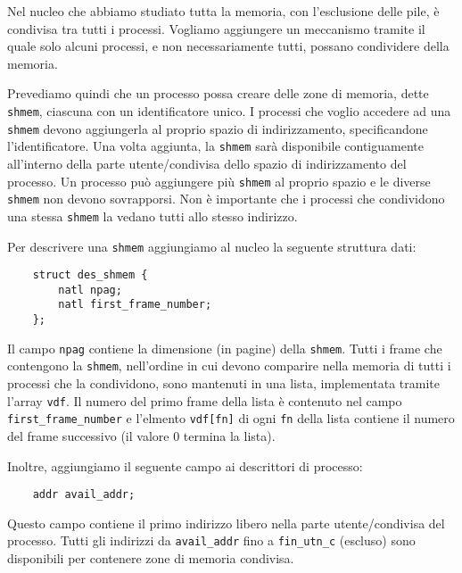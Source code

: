 Nel nucleo che abbiamo studiato tutta la memoria, con l'esclusione
delle pile, \`e condivisa tra tutti i processi. Vogliamo aggiungere un
meccanismo tramite il quale solo alcuni processi, e non necessariamente
tutti, possano condividere della memoria.

Prevediamo quindi che un processo possa creare delle zone di memoria, dette 
\verb|shmem|, ciascuna con
un identificatore unico. I processi che voglio accedere ad una \verb|shmem|
devono aggiungerla al proprio spazio di indirizzamento, specificandone l'identificatore.
Una volta aggiunta, la \verb|shmem| sar\`a disponibile contiguamente all'interno della parte
utente/condivisa dello spazio di indirizzamento del processo. Un processo pu\`o aggiungere
pi\`u \verb|shmem| al proprio spazio e le diverse \verb|shmem| non devono sovrapporsi.
Non \`e importante che i processi che condividono una stessa \verb|shmem| la vedano tutti
allo stesso indirizzo.

Per descrivere una \verb|shmem| aggiungiamo al nucleo la seguente struttura dati:

\begin{verbatim}
    struct des_shmem {
        natl npag;
        natl first_frame_number;
    };
\end{verbatim}

Il campo \verb|npag| contiene la dimensione (in pagine) della \verb|shmem|.
Tutti i frame che contengono la \verb|shmem|, nell'ordine in cui
devono comparire nella memoria di tutti i processi che la condividono,
sono mantenuti in una lista, implementata tramite l'array \verb|vdf|. Il numero del
primo frame della lista \`e contenuto nel campo \verb|first_frame_number| e l'elmento
\verb|vdf[fn]| di ogni \verb|fn| della lista contiene il numero del frame successivo
(il valore 0 termina la lista).

Inoltre, aggiungiamo il seguente campo ai descrittori di processo:

\begin{verbatim}
    addr avail_addr;
\end{verbatim}

Questo campo contiene il primo indirizzo libero nella parte utente/condivisa del processo.
Tutti gli indirizzi da \verb|avail_addr| fino a \verb|fin_utn_c| (escluso) sono disponibili
per contenere zone di memoria condivisa.

